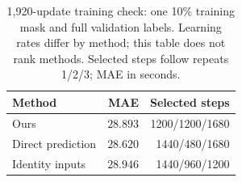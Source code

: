 \begin{table}[t]
\centering\footnotesize\setlength{\tabcolsep}{4pt}
\caption{1,920-update training check: one 10\% training mask and full validation labels. Learning rates differ by method; this table does not rank methods. Selected steps follow repeats 1/2/3; MAE in seconds.}\label{tab:convergence}
\begin{tabular}{lrr}\toprule
Method & MAE & Selected steps\\\midrule
Ours & $28.893$ & 1200/1200/1680\\
Direct prediction & $28.620$ & 1440/480/1680\\
Identity inputs & $28.946$ & 1440/960/1200\\
\bottomrule\end{tabular}
\end{table}
